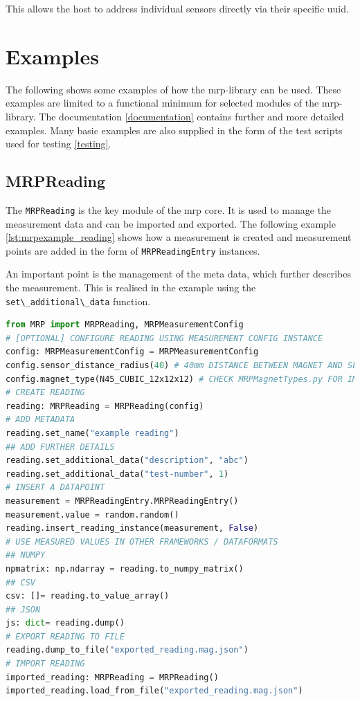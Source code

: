 This allows the host to address individual sensors directly via their
specific \gls{uuid}.

\hypertarget{examples}{%
\section{Examples}\label{examples}}

The following shows some examples of how the \gls{mrp}-library can be
used. These examples are limited to a functional minimum for selected
modules of the \gls{mrp}-library. The documentation \ref{documentation}
contains further and more detailed examples. Many basic examples are
also supplied in the form of the test scripts used for testing
\ref{testing}.

\hypertarget{mrpreading}{%
\subsection{MRPReading}\label{mrpreading}}

The \passthrough{\lstinline!MRPReading!} is the key module of the
\gls{mrp} core. It is used to manage the measurement data and can be
imported and exported. The following example
\ref{lst:mrpexample_reading} shows how a measurement is created and
measurement points are added in the form of
\passthrough{\lstinline!MRPReadingEntry!} instances.

An important point is the management of the meta data, which further
describes the measurement. This is realised in the example using the
\passthrough{\lstinline!set\_additional\_data!} function.

\begin{lstlisting}[language=Python, caption={MRPReading example for setting up an basic measurement}, label=lst:mrpexample_reading]
from MRP import MRPReading, MRPMeasurementConfig
# [OPTIONAL] CONFIGURE READING USING MEASUREMENT CONFIG INSTANCE
config: MRPMeasurementConfig = MRPMeasurementConfig
config.sensor_distance_radius(40) # 40mm DISTANCE BETWEEN MAGNET AND SENSOR
config.magnet_type(N45_CUBIC_12x12x12) # CHECK MRPMagnetTypes.py FOR IMPLEMENTED TYPES
# CREATE READING
reading: MRPReading = MRPReading(config)
# ADD METADATA
reading.set_name("example reading")
## ADD FURTHER DETAILS
reading.set_additional_data("description", "abc")
reading.set_additional_data("test-number", 1)
# INSERT A DATAPOINT
measurement = MRPReadingEntry.MRPReadingEntry()
measurement.value = random.random()
reading.insert_reading_instance(measurement, False)
# USE MEASURED VALUES IN OTHER FRAMEWORKS / DATAFORMATS
## NUMPY
npmatrix: np.ndarray = reading.to_numpy_matrix()
## CSV
csv: []= reading.to_value_array()
## JSON
js: dict= reading.dump()
# EXPORT READING TO FILE
reading.dump_to_file("exported_reading.mag.json")
# IMPORT READING
imported_reading: MRPReading = MRPReading()
imported_reading.load_from_file("exported_reading.mag.json")
\end{lstlisting}

